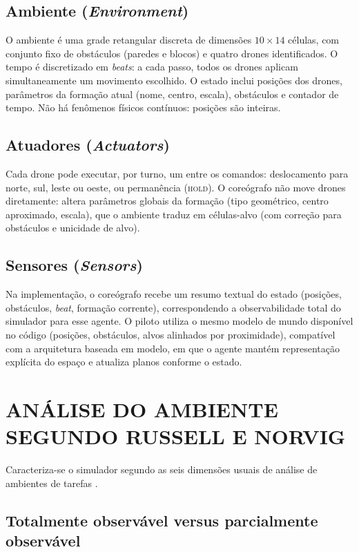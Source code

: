 \documentclass[12pt,a4paper,oneside]{article}
\begin{document}
\subsection{Ambiente (\textit{Environment})}

O ambiente é uma grade retangular discreta de dimensões $10 \times 14$ células, com conjunto fixo de obstáculos (paredes e blocos) e quatro drones identificados. O tempo é discretizado em \textit{beats}: a cada passo, todos os drones aplicam simultaneamente um movimento escolhido. O estado inclui posições dos drones, parâmetros da formação atual (nome, centro, escala), obstáculos e contador de tempo. Não há fenômenos físicos contínuos: posições são inteiras.

\subsection{Atuadores (\textit{Actuators})}

Cada drone pode executar, por turno, um entre os comandos: deslocamento para norte, sul, leste ou oeste, ou permanência (\textsc{hold}). O coreógrafo não move drones diretamente: altera parâmetros globais da formação (tipo geométrico, centro aproximado, escala), que o ambiente traduz em células-alvo (com correção para obstáculos e unicidade de alvo).

\subsection{Sensores (\textit{Sensors})}

Na implementação, o coreógrafo recebe um resumo textual do estado (posições, obstáculos, \textit{beat}, formação corrente), correspondendo a observabilidade total do simulador para esse agente. O piloto utiliza o mesmo modelo de mundo disponível no código (posições, obstáculos, alvos alinhados por proximidade), compatível com a arquitetura baseada em modelo, em que o agente mantém representação explícita do espaço e atualiza planos conforme o estado.

\section{ANÁLISE DO AMBIENTE SEGUNDO RUSSELL E NORVIG}

Caracteriza-se o simulador segundo as seis dimensões usuais de análise de ambientes de tarefas \cite{russell2021}.

\subsection{Totalmente observável versus parcialmente observável}
\end{document}
